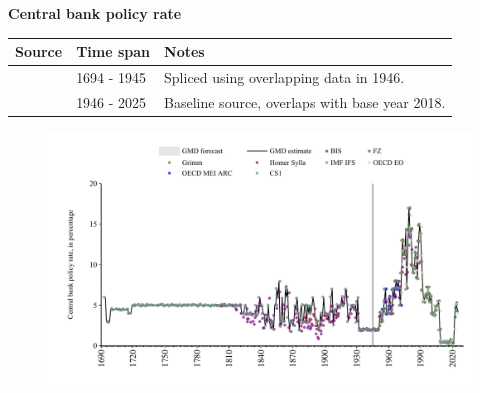\documentclass[12pt,a4paper,landscape]{article}
\begin{document}
\begin{adjustbox}{max totalsize={\paperwidth}{\paperheight},center}
\begin{minipage}[t][\textheight][t]{\textwidth}
\vspace*{0.5cm}
{}
\begin{center}
{\Large\bfseries Central bank policy rate}
\end{center}
\vspace{0.5cm}
\begin{table}[H]
\centering
\small
\begin{tabular}{|l|l|l|}
\hline
\textbf{Source} & \textbf{Time span} & \textbf{Notes} \\
\hline
\rowcolor{white}\cite{CS1_GBR}& 1694 - 1945 &Spliced using overlapping data in 1946. \\
\rowcolor{lightgray}\cite{BIS}& 1946 - 2025 &Baseline source, overlaps with base year 2018. \\
\hline
\end{tabular}
\end{table}
\begin{figure}[H]
\centering
\includegraphics[width=\textwidth,height=0.6\textheight,keepaspectratio]{graphs/GBR_cbrate.pdf}
\end{figure}
\end{minipage}
\end{adjustbox}
\end{document}
